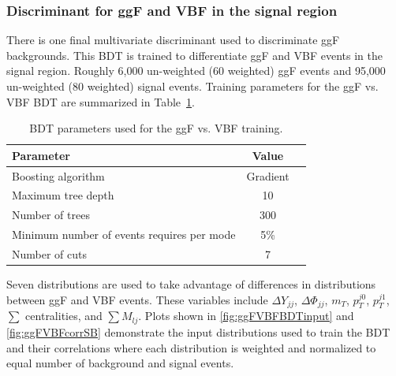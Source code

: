 \subsubsection{Discriminant for ggF and VBF in the signal region}
There is one final multivariate discriminant used to discriminate ggF backgrounds. This BDT is trained to differentiate ggF and VBF events in the signal region. Roughly 6,000 un-weighted (60 weighted) ggF events and 95,000 un-weighted (80 weighted) signal events. Training parameters for the ggF vs. VBF BDT are summarized in Table~\ref{tab:ggFVBFBDTparameters}.
\begin{table}[h!]
\centering
\begin{tabular}{|l|c|c|}
\hline
Parameter                                    & Value     \\
\hline
Boosting algorithm                           & Gradient \\
Maximum tree depth                           &  10      \\
Number of trees                              &  300    \\
Minimum number of events requires per mode   &  5\%     \\
Number of cuts                               &  7       \\
\hline
\end{tabular}
\caption{BDT parameters used for the ggF vs. VBF training.}
\label{tab:ggFVBFBDTparameters}
\end{table}

Seven distributions are used to take advantage of differences in distributions between ggF and VBF events. These variables include $\Delta Y_{jj}$, $\Delta \Phi_{jj}$, $m_T$, $p_T^{j0}$, $p_T^{j1}$, $\sum$ centralities, and $\sum M_{lj}$. Plots shown in \ref{fig:ggFVBFBDTinput} and \ref{fig:ggFVBFcorrSB} demonstrate the input distributions used to train the BDT and their correlations where each distribution is weighted and normalized to equal number of background and signal events.

